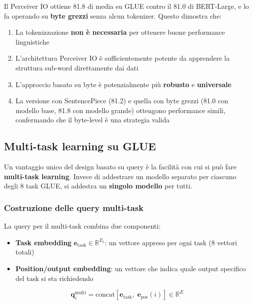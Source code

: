 \documentclass[12pt,a4paper]{article}
\begin{document}
\begin{notabox}
Il Perceiver IO ottiene 81.8 di media su GLUE contro il 81.0 di BERT-Large, e lo fa operando su \textbf{byte grezzi} senza alcun tokenizer. Questo dimostra che:
\begin{enumerate}
    \item La tokenizzazione \textbf{non \`e necessaria} per ottenere buone performance linguistiche
    \item L'architettura Perceiver IO \`e sufficientemente potente da apprendere la struttura sub-word direttamente dai dati
    \item L'approccio basato su byte \`e potenzialmente pi\`u \textbf{robusto} e \textbf{universale}
    \item La versione con SentencePiece (81.2) e quella con byte grezzi (81.0 con modello base, 81.8 con modello grande) ottengono performance simili, confermando che il byte-level \`e una strategia valida
\end{enumerate}
\end{notabox}

\subsection{Multi-task learning su GLUE}

Un vantaggio unico del design basato su query \`e la facilit\`a con cui si pu\`o fare \textbf{multi-task learning}. Invece di addestrare un modello separato per ciascuno degli 8 task GLUE, si addestra un \textbf{singolo modello} per tutti.

\subsubsection{Costruzione delle query multi-task}

La query per il multi-task combina due componenti:
\begin{itemize}
    \item \textbf{Task embedding} $\mathbf{e}_{\text{task}} \in \mathbb{R}^{E_t}$: un vettore appreso per ogni task (8 vettori totali)
    \item \textbf{Position/output embedding}: un vettore che indica quale output specifico del task si sta richiedendo
\end{itemize}

\[
\mathbf{q}_i^{\text{multi}} = \text{concat}\!\left[\mathbf{e}_{\text{task}}, \; \mathbf{e}_{\text{pos}}(i)\right] \in \mathbb{R}^{E}
\]
\end{document}
